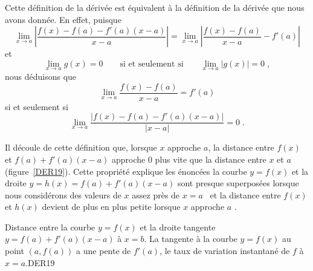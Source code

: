 {\begin{rmk}[\theory]
Cette définition de la dérivée est équivalent à la définition de la
dérivée que nous avons donnée.  En effet, puisque
\[
\lim_{x\rightarrow a} \left| \frac{f(x) - f(a) - f'(a)(x-a)}{x-a} \right|
= \lim_{x\rightarrow a} \left| \frac{f(x)-f(a)}{x-a} - f'(a) \right|
\]
et
\[
\lim_{x\rightarrow a} g(x) = 0 \qquad \text{si et seulement si} \qquad
\lim_{x\rightarrow a} |g(x)| = 0 \; ,
\]
nous déduisons que
\[
\lim_{x\rightarrow a} \frac{f(x)-f(a)}{x-a} = f'(a)
\]
si et seulement si
\[
\lim_{x\rightarrow a} \frac{|f(x) - f(a) - f'(a)(x-a)|}{|x-a|} = 0 \; .
\]

Il découle de cette définition que, lorsque $x$ approche $a$, la
distance entre $f(x)$ et $f(a)+f'(a)(x-a)$ approche $0$ plus vite que
la distance entre $x$ et $a$ (figure~\ref{DER19}).  Cette
propriété explique les énoncées \lgm la courbe $y=f(x)$ et la droite
$y=h(x)=f(a)+f'(a) (x-a)$ sont presque superposées lorsque nous
considérons des valeurs de $x$ assez près de $x=a$ \rgm\ et \lgm la
distance entre $f(x)$ et $h(x)$ devient de plus en plus petite lorsque
$x$ approche $a$ \rgm.
\end{rmk}

{Distance entre la courbe $y=f(x)$ et la droite tangente
$y=f(a)+f'(a)(x-a)$ à $x=b$.  La tangente à la courbe $y=f(x)$ au
point $(a,f(a))$ a une pente de $f'(a)$, le taux de variation
instantané de $f$ à $x=a$.}{DER19} 

}

